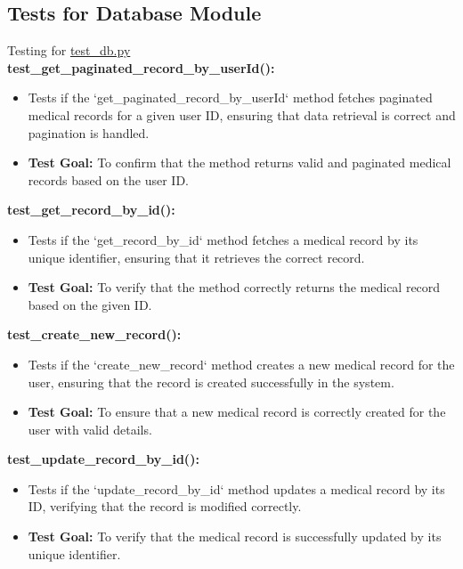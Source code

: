 \documentclass[12pt, titlepage]{article}
\begin{document}
\begin{enumerate}
\begin{enumerate}
\begin{enumerate}
\begin{enumerate}
\subsection{Tests for Database Module}
Testing for \href{https://github.com/RezaJodeiri/CXR-Capstone/blob/main/src/backend/test/test_db.py}{test\_db.py} \\ 

\textbf{test\_get\_paginated\_record\_by\_userId():}  
\begin{itemize}
    \item Tests if the `get\_paginated\_record\_by\_userId` method fetches paginated medical records for a given user ID, ensuring that data retrieval is correct and pagination is handled.
    \item \textbf{Test Goal:} To confirm that the method returns valid and paginated medical records based on the user ID.
    \newline
\end{itemize}

\textbf{test\_get\_record\_by\_id():}  
\begin{itemize}
    \item Tests if the `get\_record\_by\_id` method fetches a medical record by its unique identifier, ensuring that it retrieves the correct record.
    \item \textbf{Test Goal:} To verify that the method correctly returns the medical record based on the given ID.
    \newline
\end{itemize}

\textbf{test\_create\_new\_record():}  
\begin{itemize}
    \item Tests if the `create\_new\_record` method creates a new medical record for the user, ensuring that the record is created successfully in the system.
    \item \textbf{Test Goal:} To ensure that a new medical record is correctly created for the user with valid details.
    \newline
\end{itemize}

\textbf{test\_update\_record\_by\_id():}  
\begin{itemize}
    \item Tests if the `update\_record\_by\_id` method updates a medical record by its ID, verifying that the record is modified correctly.
    \item \textbf{Test Goal:} To verify that the medical record is successfully updated by its unique identifier.
    \newline
\end{itemize}


\end{enumerate}
\end{enumerate}
\end{enumerate}
\end{enumerate}
\end{document}
